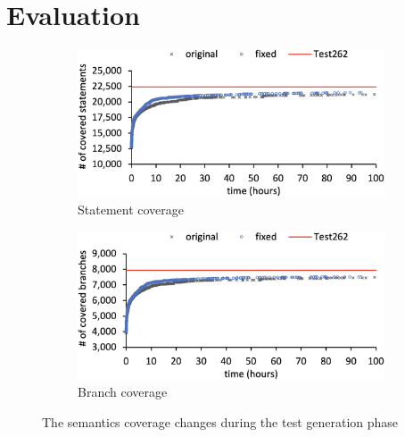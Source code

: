 \section{Evaluation}\label{sec:eval}

\begin{figure}[t]
  \centering
  \begin{subfigure}[t]{0.48\textwidth}
    \includegraphics[width=\textwidth]{img/stmt-coverage}
    \caption{Statement coverage}
    \label{fig:stmt-coverage}
  \end{subfigure}
  \quad
  \begin{subfigure}[t]{0.48\textwidth}
    \includegraphics[width=\textwidth]{img/branch-coverage}
    \caption{Branch coverage}
    \label{fig:branch-coverage}
  \end{subfigure}
  \caption{The semantics coverage changes during the test generation phase}
  \label{fig:sem-coverage}
  \vspace*{-1em}
\end{figure}

